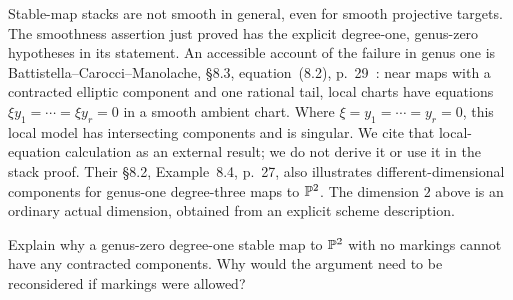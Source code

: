 Stable-map stacks are not smooth in general, even for smooth projective targets. The smoothness assertion just proved has the explicit degree-one, genus-zero hypotheses in its statement. An accessible account of the failure in genus one is Battistella--Carocci--Manolache, \S8.3, equation~(8.2), p.~29~\cite{BCM}: near maps with a contracted elliptic component and one rational tail, local charts have equations $\xi y_1=\cdots=\xi y_r=0$ in a smooth ambient chart. Where $\xi=y_1=\cdots=y_r=0$, this local model has intersecting components and is singular. We cite that local-equation calculation as an external result; we do not derive it or use it in the stack proof. Their \S8.2, Example~8.4, p.~27, also illustrates different-dimensional components for genus-one degree-three maps to $\mathbb P^2$. The dimension $2$ above is an ordinary actual dimension, obtained from an explicit scheme description.

\begin{Ej}\label{maps:ex-tree}
Explain why a genus-zero degree-one stable map to $\mathbb P^2$ with no markings cannot have any contracted components. Why would the argument need to be reconsidered if markings were allowed?
\end{Ej}
